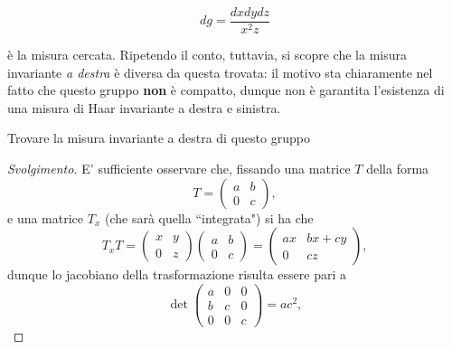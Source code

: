 \begin{example}
\begin{enumerate}[label=\protect\circled{\arabic*}]
            \begin{equation} \label{eq:mis_triang_destra}
                dg = \frac{dx dy dz}{x^2 z}
            \end{equation}
            
            è la misura cercata. Ripetendo il conto, tuttavia, si scopre che la misura invariante \emph{a destra} è diversa da questa trovata:
            il motivo sta chiaramente nel fatto che questo gruppo \textbf{non} è compatto, dunque non è garantita l'esistenza di una misura di Haar invariante a destra e sinistra.
            \begin{exercise}
                Trovare la misura invariante a destra di questo gruppo
            \end{exercise}
            \begin{proof}[Svolgimento]
                E' sufficiente osservare che, fissando una matrice $T$ della forma
                \begin{equation}
                    T = \begin{pmatrix}
                        a & b \\
                        0 & c
                    \end{pmatrix},
                \end{equation}
                e una matrice $T_x$ (che sarà quella ``integrata") si ha che
                \begin{equation}
                    T_x T = \begin{pmatrix}
                        x & y \\
                        0 & z
                    \end{pmatrix} \begin{pmatrix}
                        a & b \\
                        0 & c
                    \end{pmatrix} = \begin{pmatrix}
                        ax & bx + cy \\
                        0  & cz
                    \end{pmatrix},
                \end{equation} 
                dunque lo jacobiano della trasformazione risulta essere pari a
                \begin{equation}
                    \det{\begin{pmatrix} a & 0 & 0 \\ b & c & 0 \\ 0 & 0 & c \end{pmatrix}} = ac^2,

\end{equation}
\end{proof}
\end{enumerate}
\end{example}
